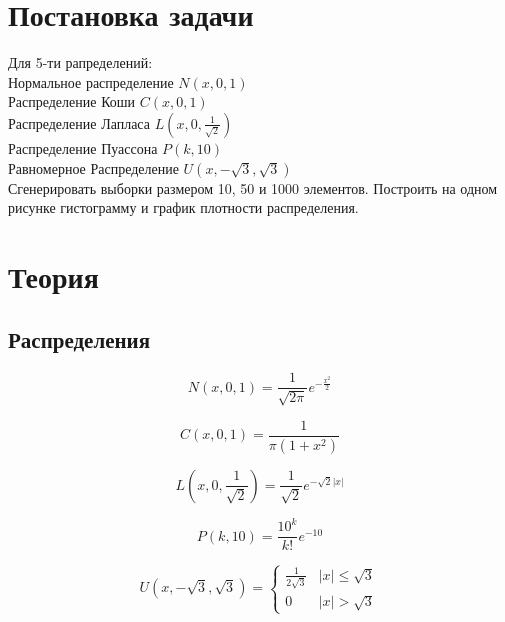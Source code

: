 \documentclass[a4]{article}
\begin{document}
	
	\newpage
	\tableofcontents{}
	\newpage
	\listoffigures
	\newpage
	\listoftables
	\newpage
	
	
	\section{Постановка задачи}
	
	Для 5-ти рапределений:\\
		Нормальное распределение $N(x,0,1)$\\
		Распределение Коши $C(x,0,1)$\\
		Распределение Лапласа $L( x,0,\frac{1}{\sqrt{2}})$\\
		Распределение Пуассона $P(k, 10)$\\
		Равномерное Распределение $U(x,-\sqrt{3}, \sqrt{3})$\\
		
		Сгенерировать выборки размером 10, 50 и 1000 элементов.
		Построить на одном рисунке гистограмму и график плотности распределения.
		
	
	\section{Теория}
		\subsection{Распределения}
		
			\begin{equation}\label{eqn:normal}
			N(x,0,1) = \frac{1}{\sqrt{2\pi}}e^{-\frac{x^2}{2}}
			\end{equation} 
			
			\begin{equation}\label{eqn:cauchy}
			C(x,0,1) = \frac{1}{\pi(1+x^2)}
			\end{equation}
			
			\begin{equation}\label{eqn:laplace}
			L\left( x,0,\frac{1}{\sqrt{2}}\right) = \frac{1}{\sqrt{2}}e^{-\sqrt{2}\vert x\vert}
			\end{equation}
			
			\begin{equation}\label{eqn:poisson}
			P(k,10) = \frac{10^k}{k!}e^{-10}
			\end{equation}  
			
			\begin{equation}\label{eqn:uniform}
			U(x,-\sqrt{3}, \sqrt{3}) = 
			\begin{cases}
			\frac{1}{2\sqrt{3}} &\vert x\vert \leqslant \sqrt{3}\\
			0 &\vert x\vert > \sqrt{3}
			\end{cases}
			\end{equation}
		
\end{document}
